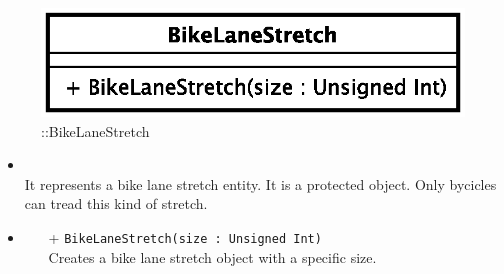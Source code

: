 \begin{figure}[h]
\centering
\includegraphics[scale=0.6,keepaspectratio]{images/solution/app/backend/bike_lane_stretch.eps}
\caption{\pReactiveComponentStretch::BikeLaneStretch}
\label{fig:sd-app-bike_lane_stretch}
\end{figure}
\FloatBarrier
\begin{itemize}
  \item \textbf{\descr} \\
    It represents a bike lane stretch entity. It is a protected object. Only bycicles 
can tread this kind of stretch.
  \item \textbf{\ops}
  \begin{itemize}
    \item[+] \texttt{BikeLaneStretch(size : Unsigned Int)} \\
        Creates a bike lane stretch object with a specific size.
  \end{itemize}
\end{itemize}
